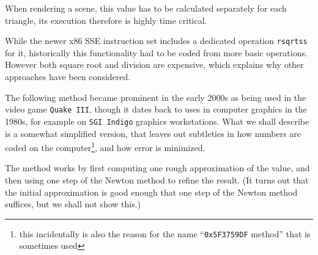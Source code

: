When rendering a scene, this value has to be calculated separately for each
triangle, its execution therefore is highly time critical.

While the newer x86 SSE instruction set includes a dedicated operation
\texttt{rsqrtss} for it, historically this functionality had to be coded from
more basic operations. However both square root and division are expensive,
which explains why other approaches have been considered.

The following method became prominent in the early 2000s as being used in
the video game \texttt{Quake III}, though it dates back to uses in computer
graphics in the 1980s, for example on \texttt{SGI Indigo} graphics
workstations. What we shall describe is a somewhat simplified version, that
leaves out subtleties in how numbers are coded on the computer\footnote{this
incidentally is also the
reason for the name ``\texttt{0x5F3759DF} method'' that is sometimes used},
and how error is minimized.
\medskip

The method works by first computing one rough approximation of the value,
and then using one step of the Newton method to refine the result. (It turns
out that the initial approximation is good enough that one step of the
Newton method suffices, but we shall not show this.)
\smallskip

